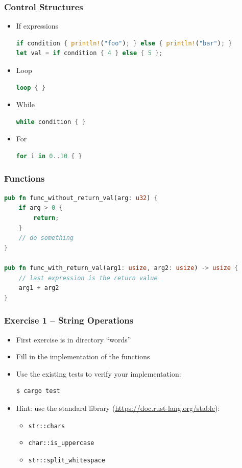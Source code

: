 \begin{frame}[fragile]
    \frametitle{Control Structures}

    \begin{itemize}
        \item If expressions
    \begin{lstlisting}[language=rust]
if condition { println!("foo"); } else { println!("bar"); }
let val = if condition { 4 } else { 5 };
    \end{lstlisting}
        \item Loop
    \begin{lstlisting}[language=rust]
loop { }
    \end{lstlisting}
        \item While
    \begin{lstlisting}[language=rust]
while condition { }
    \end{lstlisting}
        \item For
    \begin{lstlisting}[language=rust]
for i in 0..10 { }
    \end{lstlisting}
    \end{itemize}
\end{frame}

\begin{frame}[fragile]
    \frametitle{Functions}

    \begin{lstlisting}[language=rust]
pub fn func_without_return_val(arg: u32) {
    if arg > 0 {
        return;
    }
    // do something
}

pub fn func_with_return_val(arg1: usize, arg2: usize) -> usize {
    // last expression is the return value
    arg1 + arg2
}
    \end{lstlisting}
\end{frame}

\begin{frame}[fragile]
    \frametitle{Exercise 1 -- String Operations}

    \begin{itemize}
        \item First exercise is in directory ``words''
        \item Fill in the implementation of the functions
        \item Use the existing tests to verify your implementation:
    \begin{lstlisting}[language=bash]
$ cargo test
    \end{lstlisting}
        \item Hint: use the standard library (\url{https://doc.rust-lang.org/stable}):
        \begin{itemize}
            \item \texttt{str::chars}
            \item \texttt{char::is\_uppercase}
            \item \texttt{str::split\_whitespace}
        \end{itemize}
    \end{itemize}
\end{frame}
